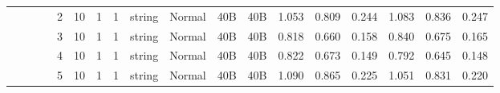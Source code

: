 \begin{landscape}
\begin{table}[]
{\begin{tabular}{@{}ccccllllllllllllll@{}}
                                                                                   &                              &                                &                                                                                                          & 2                                                     & 10                                       & 1                                          & 1                                 & string                           & Normal                             & 40B                                           & 40B                                             & 1.053                   & 0.809    & 0.244                        & 1.083                   & 0.836    & 0.247                        \\
                                                                                   &                              &                                &                                                                                                          & 3                                                     & 10                                       & 1                                          & 1                                 & string                           & Normal                             & 40B                                           & 40B                                             & 0.818                   & 0.660    & 0.158                        & 0.840                   & 0.675    & 0.165                        \\
                                                                                   &                              &                                &                                                                                                          & 4                                                     & 10                                       & 1                                          & 1                                 & string                           & Normal                             & 40B                                           & 40B                                             & 0.822                   & 0.673    & 0.149                        & 0.792                   & 0.645    & 0.148                        \\
                                                                                   &                              &                                &                                                                                                          & 5                                                     & 10                                       & 1                                          & 1                                 & string                           & Normal                             & 40B                                           & 40B                                             & 1.090                   & 0.865    & 0.225                        & 1.051                   & 0.831    & 0.220                        \\

\end{tabular}}
\end{table}
\end{landscape}
